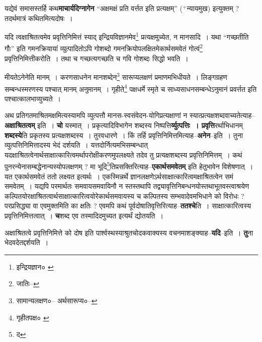 \documentclass[article,12pt,a4paper]{memoir}
\newcommand{\add}[1]{($^{+}$#1)}
\begin{document}
	  \pstart यद्येवं समासस्तर्हि कथ\textbf{माचार्यदिग्नागेन} “अक्षमक्षं प्रति वर्त्तत इति प्रत्यक्षम्” \add{न्यायमुख} इत्युक्तम् ? तदर्थमात्रं कथितमित्यदोषः ।
	\pend
	  \bigskip
	  \begingroup
	

	  \pstart यदि त्वक्षाश्रितत्वमेव प्रवृत्तिनिमित्तं स्याद् इन्द्रियविज्ञानमेव\footnote{इन्द्रियज्ञान० \cite{dp-msA} \cite{dp-edP} \cite{dp-edH} \cite{dp-edE}} प्रत्यक्षमुच्येत, न मानसादि । यथा “गच्छतीति गौः” इति गमनक्रियायां व्युत्पादितोऽपि गोशब्दो गमनक्रियोपलक्षितमेकार्थसमवेतं गोत्वं\footnote{जातिः--\cite{dp-msD-n}} प्रवृत्तिनिमित्तीकरोति । तथा च गच्छत्यगच्छति च गवि गोशब्दः सिद्धो भवति ।
	\pend
       

	  \pstart मीयतेऽनेनेति मानम् । करणसाधनेन मानशब्देन\footnote{सामान्यलक्षण०--\cite{dp-msD-n} अर्थसारूप्य०--\cite{dp-msD-n}} सारूप्यलक्षणं प्रमाणमभिधीयते । लिङ्गग्रहण सम्बन्धस्मरणस्य पश्चात् मानम् अनुमानम् । गृहीते\footnote{गृहीतपक्ष० \cite{dp-msB}} पक्षधर्मे स्मृते च साध्यसाधनसम्बन्धेऽनुमानं प्रवर्त्तत इति पश्चात्कालभाव्युच्यते ।
	\pend
      
	  \endgroup
	

	  \pstart अथ प्रतिगतमाश्रितमक्षमित्यस्यामपि व्युत्पत्तौ मानस-स्वसंवेदन-योगिप्रत्यक्षाणां न स्यात्प्रत्यक्षशब्दवाच्यतेत्याह--\textbf{अक्षाश्रितत्वम्} इति । \textbf{चो} यस्मात् । प्रकृत्यादिविभागेन शब्दस्य निष्पत्ति\textbf{र्व्युत्पत्तिः । प्रवृत्ति}रर्थाभिधानम् \textbf{शब्दस्ये}ति प्रकृतस्य प्रत्यक्षशब्दस्य । तुरवधारणे । किं तर्हि प्रवृत्तिनिमित्तमित्याह--\textbf{अनेन}--इति । तुना व्युत्पत्तिनिमित्तादस्य भेदं द\leavevmode{}र्शयति । यत्तदोर्नित्यमभिसम्बन्धात् यदक्षाश्रितत्वेनार्थसाक्षात्कारित्वमर्थापरोक्षीकरणमुपलक्ष्यते तदेव तु प्रत्यक्षशब्दस्य प्रवृत्तिनिमित्तम् । कथं पुनरन्येनासम्बद्धेनान्यस्योपलक्षणम् ? मा भूदि\footnote{द}\-तिप्रसक्तिरित्याह--\textbf{एकार्थसमवेतम्} इति हेतुभावेन विशेषणात् । यत एकार्थसमवेतं ततो लक्ष्यत इत्यर्थः । एकस्मिन्नर्थे ज्ञानलक्षणेऽर्थसाक्षात्कारित्वमक्षाश्रितत्वेन समं समवेतम् । यद्यपि परमार्थतः समवायसमवायिनौ न स्तस्तथापि तद्व्यावृत्तिनिबन्धनयोस्तथाभूतवस्त्वाश्रयेण कल्पितयोरक्षाश्रितत्वार्थसाक्षात्कारित्वयोरेकार्थसमवायस्य च कल्पितस्य सम्भवादेवमभिधाने को विरोधः ? परप्रसिद्ध्या वा एवमुक्तमिति का क्षतिः ? एवमपि कथं पूर्वदोषातिवृत्तिरित्याह--\textbf{ततश्चे}ति । साक्षात्कारित्वस्य प्रवृत्तिनिमित्तत्वात् । \textbf{च}शब्द एव तस्मादिदमुच्यत इत्यर्थं द्योतयति ।
	\pend
      

	  \pstart अक्षाश्रितत्वे प्रवृत्तिनिमित्ते को दोष इति पार्श्वस्थस्याश्रुतचोदकवाक्यस्य वचनमाशङ्क्याह--\textbf{यदि}--इति । \textbf{तु}ना भेदवदेतद्दर्शयति ।
	\pend
      
\end{document}
